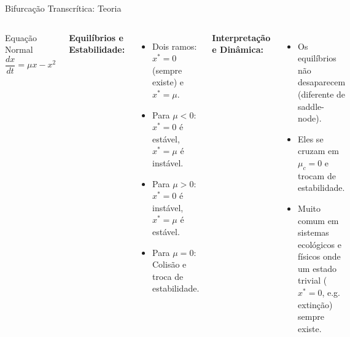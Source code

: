 \begin{frame}{Bifurcação Transcrítica: Teoria}
\begin{columns}
\begin{block}{Equação Normal}
\begin{equation*}
\frac{dx}{dt} = \mu x - x^2
\end{equation*}
\end{block}

\textbf{Equilíbrios e Estabilidade:}
\begin{itemize}
    \item Dois ramos: $x^* = 0$ (sempre existe) e $x^* = \mu$.
    \item Para $\mu < 0$: $x^*=0$ é estável, $x^*=\mu$ é instável.
    \item Para $\mu > 0$: $x^*=0$ é instável, $x^*=\mu$ é estável.
    \item Para $\mu = 0$: Colisão e troca de estabilidade.
\end{itemize}

\textbf{Interpretação e Dinâmica:}
\begin{itemize}
    \item Os equilíbrios não desaparecem (diferente de saddle-node).
    \item Eles se cruzam em $\mu_c = 0$ e trocam de estabilidade.
    \item Muito comum em sistemas ecológicos e físicos onde um estado trivial ($x^*=0$, e.g. extinção) sempre existe.
\end{itemize}
\end{columns}
\end{frame}

